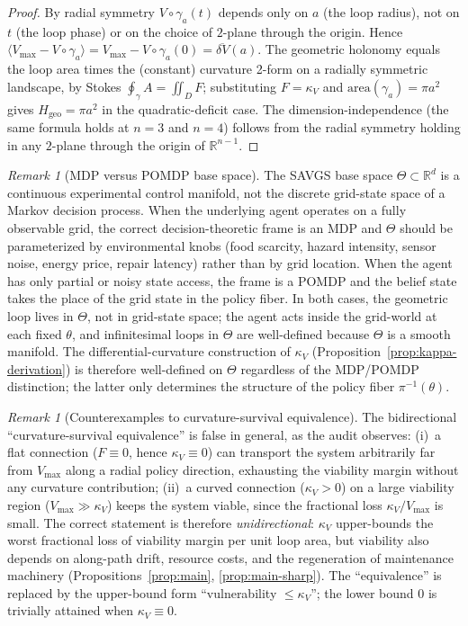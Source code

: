 \documentclass[11pt,a4paper]{article}
\theoremstyle{plain}
\theoremstyle{definition}
\theoremstyle{remark}
\newtheorem{remark}[theorem]{Remark}
\newcommand{\kk}{\kappa_{\!V}}
\newcommand{\RR}{\mathbb{R}}
\begin{document}
\begin{proof}
By radial symmetry $V\circ\gamma_a(t)$ depends only on $a$ (the loop
radius), not on $t$ (the loop phase) or on the choice of $2$-plane
through the origin. Hence $\langle V_{\max} - V\circ\gamma_a\rangle =
V_{\max} - V\circ\gamma_a(0) = \overline{\delta V}(a)$. The geometric
holonomy equals the loop area times the (constant) curvature 2-form on
a radially symmetric landscape, by Stokes
$\oint_\gamma A = \iint_D F$; substituting $F = \kk$ and
$\mathrm{area}(\gamma_a) = \pi a^2$ gives $H_{\mathrm{geo}} = \pi a^2$
in the quadratic-deficit case. The dimension-independence (the same
formula holds at $n=3$ and $n=4$) follows from the radial symmetry
holding in any $2$-plane through the origin of $\RR^{n-1}$.
\end{proof}

\begin{remark}[MDP versus POMDP base space]
\label{rem:mdp-pomdp}
The SAVGS base space $\Theta \subset \RR^d$ is a continuous
experimental control manifold, not the discrete grid-state space of a
Markov decision process. When the underlying agent operates on a fully
observable grid, the correct decision-theoretic frame is an MDP and
$\Theta$ should be parameterized by environmental knobs (food scarcity,
hazard intensity, sensor noise, energy price, repair latency) rather
than by grid location. When the agent has only partial or noisy state
access, the frame is a POMDP and the belief state takes the place of
the grid state in the policy fiber. In both cases, the geometric loop
lives in $\Theta$, not in grid-state space; the agent acts inside the
grid-world at each fixed $\theta$, and infinitesimal loops in $\Theta$
are well-defined because $\Theta$ is a smooth manifold. The
differential-curvature construction of $\kk$
(Proposition~\ref{prop:kappa-derivation}) is therefore well-defined on
$\Theta$ regardless of the MDP/POMDP distinction; the latter only
determines the structure of the policy fiber $\pi^{-1}(\theta)$.
\end{remark}

\begin{remark}[Counterexamples to curvature-survival equivalence]
\label{rem:curv-counterex}
The bidirectional ``curvature-survival equivalence'' is false in
general, as the audit observes: (i)~a flat connection
($F \equiv 0$, hence $\kk \equiv 0$) can transport the system
arbitrarily far from $V_{\max}$ along a radial policy direction,
exhausting the viability margin without any curvature contribution;
(ii)~a curved connection ($\kk > 0$) on a large viability region
($V_{\max} \gg \kk$) keeps the system viable, since the fractional
loss $\kk / V_{\max}$ is small. The correct statement is therefore
\emph{unidirectional}: $\kk$ upper-bounds the worst fractional loss of
viability margin per unit loop area, but viability also depends on
along-path drift, resource costs, and the regeneration of maintenance
machinery (Propositions~\ref{prop:main}, \ref{prop:main-sharp}). The
``equivalence'' is replaced by the upper-bound form
``vulnerability $\leq \kk$''; the lower bound $0$ is trivially
attained when $\kk \equiv 0$.
\end{remark}
\end{document}
